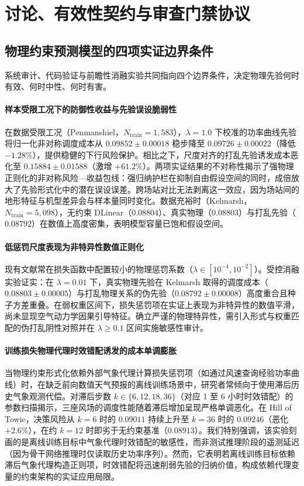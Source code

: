 \section{讨论、有效性契约与审查门禁协议}
\label{sec:discussion}

\subsection{物理约束预测模型的四项实证边界条件}
系统审计、代码验证与前瞻性消融实验共同指向四个边界条件，决定物理先验何时有效、何时中性、何时有害。

\paragraph{样本受限工况下的防御性收益与先验误设脆弱性}
在数据受限工况（Penmanshiel，$N_{\text{train}}=1,583$），$\lambda=1.0$ 下校准的功率曲线先验将归一化非对称调度成本从 $0.09852 \pm 0.00018$ 稳步降至 $0.09726 \pm 0.00022$（降低 $-1.28\%$），提供稳健的下行风险保护。相比之下，尺度对齐的打乱先验诱发成本恶化至 $0.15884 \pm 0.01588$（激增 $+61.2\%$）。两项实证结果的不对称性揭示了强物理正则化的非对称风险—收益包线：强归纳护栏在抑制自由假设空间的同时，成倍放大了先验形式化中的潜在误设误差。跨场站对比无法剥离这一效应，因为场站间的地形特征与机型差异会与样本量同时变化。数据充裕时（Kelmarsh，$N_{\text{train}}=5,098$），无约束 DLinear（$0.08804$）、真实物理（$0.08803$）与打乱先验（$0.08792$）在数值上高度密集，表明模型容量已饱和假设空间。

\paragraph{低惩罚尺度表现为非特异性数值正则化}
现有文献常在损失函数中配置较小的物理惩罚系数（$\lambda \in [10^{-4}, 10^{-2}]$）。受控消融实验证实：在 $\lambda = 0.01$ 下，真实物理先验在 Kelmarsh 取得的调度成本（$0.08803 \pm 0.00005$）与打乱物理关系的伪先验（$0.08792 \pm 0.00008$）高度重合且种子方差重叠。在弱权重区间下，损失惩罚项在实证上表现为非特异性的数值平滑，尚未显现空气动力学因果引导特征。确立严谨的物理特异性，需引入形式与权重匹配的伪打乱阴性对照并在 $\lambda \ge 0.1$ 区间实施敏感性审计。

\paragraph{训练损失物理代理时效错配诱发的成本单调膨胀}
当物理约束形式化依赖外部气象代理计算损失惩罚项（如通过风速查询经验功率曲线）时，在缺乏前向数值天气预报的离线训练场景中，研究者常倾向于使用滞后历史气象观测代偿。对滞后步数 $k \in \{6, 12, 18, 36\}$（对应 1 至 6 小时时效错配）的参数扫描揭示，三座风场的调度性能随着滞后增加呈现严格单调恶化。在 Hill of Towie，决策风险从 $k=6$ 时的 $0.09011$ 持续上升至 $k=36$ 时的 $0.09246$（恶化 $+2.6\%$），在约 $k=12$ 时即劣于无约束基准（$0.08913$）。我们特别强调，该实验刻画的是离线训练目标中气象代理时效错配的敏感性，而非测试推理阶段的遥测延迟（因为骨干网络推理时仅读取历史功率序列）。然而，它表明若离线训练目标依赖滞后气象代理构造正则项，时效错配将迅速削弱先验的归纳价值，构成依赖代理变量的约束架构的实证应用局限。

